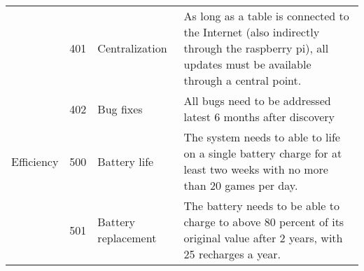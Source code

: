 \begin{table}[]
\begin{tabular}{ l l p{2.5cm} p{7.1cm}}
                        & 401 & Centralization        & As long as a table is connected to the Internet (also indirectly through the raspberry pi), all updates must be available through a central point. \\
                        & 402 & Bug fixes             & All bugs need to be addressed latest 6 months after discovery                                                                                      \\
        Efficiency      & 500 & Battery life          & The system needs to able to life on a single battery charge for at least two weeks with no more than 20 games per day.                             \\
                        & 501 & Battery replacement   & The battery needs to be able to charge to above 80 percent of its original value after 2 years, with 25 recharges a year.                         
        \end{tabular}\label{tab:nonfuncReq}
        \end{table}
        \clearpage

